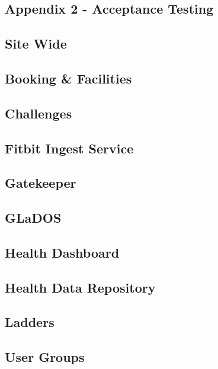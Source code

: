 \fancyhf{}
\renewcommand{\headrulewidth}{0pt}

\begin{landscape}

\section{Appendix 2 - Acceptance Testing}

\subsection{Site Wide}
	

\subsection{Booking \& Facilities}
	

\subsection{Challenges}
	

\subsection{Fitbit Ingest Service}
	

\subsection{Gatekeeper}
	

\subsection{GLaDOS}
	

\subsection{Health Dashboard}
	

\subsection{Health Data Repository}
	

\subsection{Ladders}
	

\subsection{User Groups}
	


\end{landscape}

\setchapterheaderfooter{} 
\renewcommand{\headrulewidth}{0.4pt}